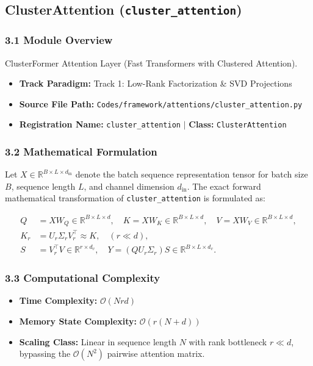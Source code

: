 \subsection{ClusterAttention (\texttt{cluster\_attention})}
\label{sec:app_module_cluster_attention}

\subsubsection*{3.1 Module Overview}
ClusterFormer Attention Layer (Fast Transformers with Clustered Attention).
\begin{itemize}
    \item \textbf{Track Paradigm:} Track 1: Low-Rank Factorization \& SVD Projections
    \item \textbf{Source File Path:} \texttt{Codes/framework/attentions/cluster\_attention.py}
    \item \textbf{Registration Name:} \texttt{cluster\_attention} $\mid$ \textbf{Class:} \texttt{ClusterAttention}
\end{itemize}

\subsubsection*{3.2 Mathematical Formulation}
Let $X \in \mathbb{R}^{B \times L \times d_{\text{in}}}$ denote the batch sequence representation tensor for batch size $B$, sequence length $L$, and channel dimension $d_{\text{in}}$. The exact forward mathematical transformation of \texttt{cluster\_attention} is formulated as:

\begin{align}
Q &= X W_Q \in \mathbb{R}^{B \times L \times d}, \quad K = X W_K \in \mathbb{R}^{B \times L \times d}, \quad V = X W_V \in \mathbb{R}^{B \times L \times d}, \\
K_r &= U_r \Sigma_r V_r^\top \approx K, \quad (r \ll d), \\
S &= V_r^\top V \in \mathbb{R}^{r \times d_v}, \quad Y = (Q U_r \Sigma_r) S \in \mathbb{R}^{B \times L \times d_v}.
\end{align}


\subsubsection*{3.3 Computational Complexity}
\begin{itemize}
    \item \textbf{Time Complexity:} $\mathcal{O}(N r d)$
    \item \textbf{Memory State Complexity:} $\mathcal{O}(r(N + d))$
    \item \textbf{Scaling Class:} Linear in sequence length $N$ with rank bottleneck $r \ll d$, bypassing the $\mathcal{O}(N^2)$ pairwise attention matrix.
\end{itemize}

